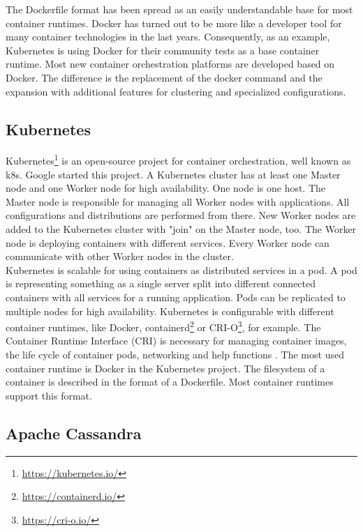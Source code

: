The Dockerfile format has been spread as an easily understandable base for most container runtimes. 
Docker has turned out to be more like a developer tool for many container technologies in the last years. 
Consequently, as an example, Kubernetes is using Docker for their community tests as a base container runtime.
Most new container orchestration platforms are developed based on Docker. The difference is the replacement of the docker command and the expansion with additional features for clustering and specialized configurations.

\subsection{Kubernetes}

Kubernetes\footnote{\url{https://kubernetes.io/}} is an open-source project for container orchestration, well known as k8s. Google started this project. A Kubernetes cluster has at least one Master node and one Worker node for high availability. One node is one host. The Master node is responsible for managing all Worker nodes with applications. All configurations and distributions are performed from there. New Worker nodes are added to the Kubernetes cluster with "join" on the Master node, too. The Worker node is deploying containers with different services. Every Worker node can communicate with other Worker nodes in the cluster. \\
Kubernetes is scalable for using containers as distributed services in a pod. A pod is representing something as a single server split into different connected containers with all services for a running application. Pods can be replicated to multiple nodes for high availability. Kubernetes is configurable with different container runtimes, like Docker, containerd\footnote{\url{https://containerd.io/}} or CRI-O\footnote{\url{https://cri-o.io/}}, for example. The Container Runtime Interface (CRI) is necessary for managing container images, the life cycle of container pods, networking and help functions \cite[~p.16]{Scholl2019}. The most used container runtime is Docker in the Kubernetes project. The filesystem of a container is described in the format of a Dockerfile. Most container runtimes support this format.


\subsection{Apache Cassandra}


